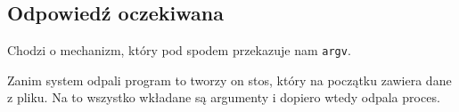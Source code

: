 \subsection{Odpowiedź oczekiwana}
Chodzi o mechanizm, który pod spodem przekazuje nam \texttt{argv}.

Zanim system odpali program to tworzy on stos, który na początku zawiera dane z pliku.
Na to wszystko wkładane są argumenty i dopiero wtedy odpala proces.
